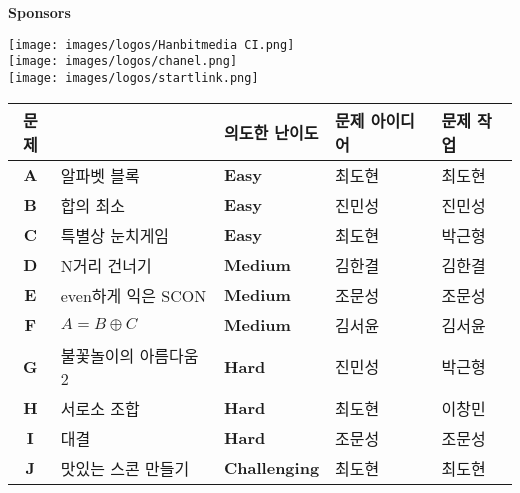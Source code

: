     \begin{frame}{\textbf{Sponsors}}
        \begin{center}
            \texttt{[image: images/logos/Hanbitmedia CI.png]}\\
            \texttt{[image: images/logos/chanel.png]}\\
            \texttt{[image: images/logos/startlink.png]}
        \end{center}
    \end{frame}
    
    \begin{frame} %
        \begin{center}
            \begin{tabular}{cl|l|l|l}
                \hline
                문제 & & 의도한 난이도 & 문제 아이디어 & 문제 작업 \\
                \hline
                \hline
                \textbf{A} & 알파벳 블록 & \textbf{\color{acbronze} Easy} & 최도현 & 최도현 \\
                \textbf{B} & 합의 최소 & \textbf{\color{acbronze} Easy} & 진민성 & 진민성 \\
                \textbf{C} & 특별상 눈치게임 & \textbf{\color{acbronze} Easy} & 최도현 & 박근형 \\
                \textbf{D} & N거리 건너기 & \textbf{\color{acsilver} Medium} & 김한결 & 김한결 \\
                \textbf{E} & even하게 익은 SCON & \textbf{\color{acsilver} Medium} & 조문성 & 조문성 \\
                \textbf{F} & $A = B \oplus C$ & \textbf{\color{acsilver} Medium} & 김서윤 &김서윤 \\
                \textbf{G} & 불꽃놀이의 아름다움 2 & \textbf{\color{acgold} Hard} & 진민성 & 박근형 \\
                \textbf{H} & 서로소 조합 & \textbf{\color{acgold} Hard} & 최도현 & 이창민 \\
                \textbf{I} & 대결 & \textbf{\color{acgold} Hard} & 조문성 & 조문성 \\
                \textbf{J} & 맛있는 스콘 만들기 & \textbf{\color{acplatinum} Challenging} & 최도현 & 최도현 \\
                \hline
            \end{tabular}
        \end{center}
    \end{frame}
    
